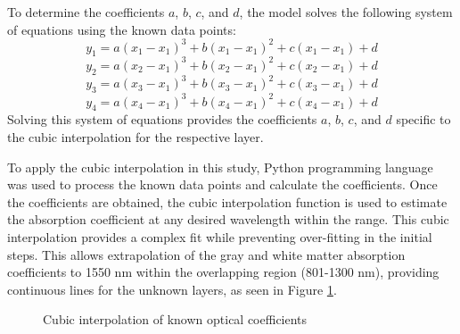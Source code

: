 \documentclass[journal,twoside,web]{ieeecolor}
\begin{document}
To determine the coefficients $a$, $b$, $c$, and $d$, the model solves the following system of equations using the known data points:
\begin{equation}
    \label{eq:cubicEq2}
    y_1 = a(x_1-x_1)^3 + b(x_1-x_1)^2 + c(x_1-x_1) + d 
\end{equation}
\begin{equation}
    \label{eq:cubicEq3}
    y_2 = a(x_2-x_1)^3 + b(x_2-x_1)^2 + c(x_2-x_1) + d 
\end{equation}
\begin{equation}
    \label{eq:cubicEq4}
    y_3 = a(x_3-x_1)^3 + b(x_3-x_1)^2 + c(x_3-x_1) + d 
\end{equation}
\begin{equation}
    \label{eq:cubicEq5}
    y_4 = a(x_4-x_1)^3 + b(x_4-x_1)^2 + c(x_4-x_1) + d 
\end{equation}
Solving this system of equations provides the coefficients $a$, $b$, $c$, and $d$ specific to the cubic interpolation for the respective layer.

To apply the cubic interpolation in this study, Python programming language was used to process the known data points and calculate the coefficients. 
Once the coefficients are obtained, the cubic interpolation function is used to estimate the absorption coefficient at any desired wavelength within the range. 
This cubic interpolation provides a complex fit while preventing over-fitting in the initial steps. This allows extrapolation of the gray and white matter 
absorption coefficients to 1550 nm within the overlapping region (801-1300 nm), providing continuous lines for the unknown layers, as seen in Figure \ref{fig:Known}.

\begin{figure}[!htb]
    \caption{\label{fig:Known} Cubic interpolation of known optical coefficients}
\end{figure}
\end{document}
